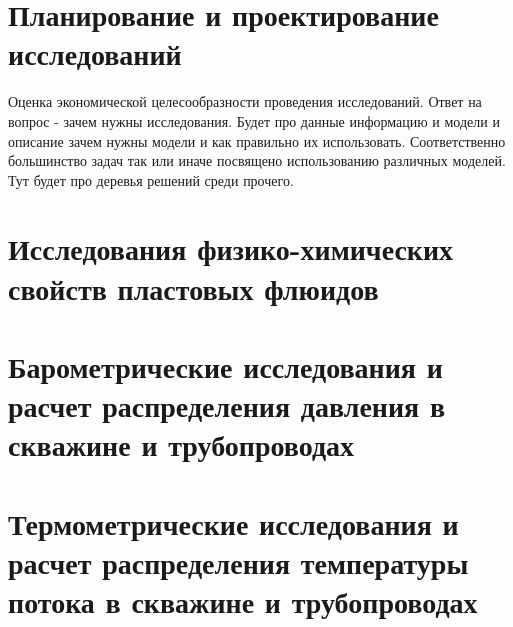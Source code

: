 \documentclass{memoir}
\begin{document}


\chapter{Планирование и проектирование исследований}

Оценка экономической целесообразности проведения исследований. Ответ на вопрос - зачем нужны исследования. 
Будет про данные информацию и модели и описание зачем нужны модели и как правильно их использовать.
Соответственно большинство задач так или иначе посвящено использованию различных моделей. 
Тут будет про деревья решений среди прочего.





\chapter{Исследования физико-химических свойств пластовых флюидов}




\chapter{Барометрические исследования и расчет распределения давления в скважине и трубопроводах}



\chapter{Термометрические исследования и расчет распределения температуры потока в скважине и трубопроводах}
\end{document}
